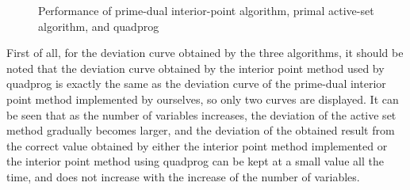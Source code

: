 \begin{figure}[H]
\centering
\setlength{\abovecaptionskip}{-0.2cm} 
\setlength{\belowcaptionskip}{-0.5cm} 
\quad
{}
\caption{Performance of prime-dual interior-point algorithm, primal
active-set algorithm, and quadprog}
\end{figure}
First of all, for the deviation curve obtained by the three algorithms, it should be noted that the deviation curve obtained by the interior point method used by quadprog is exactly the same as the deviation curve of the prime-dual interior point method implemented by ourselves, so only two curves are displayed. It can be seen that as the number of variables increases, the deviation of the active set method gradually becomes larger, and the deviation of the obtained result from the correct value obtained by either the interior point method implemented or the interior point method using quadprog can be kept at a small value all the time, and does not increase with the increase of the number of variables.\\


